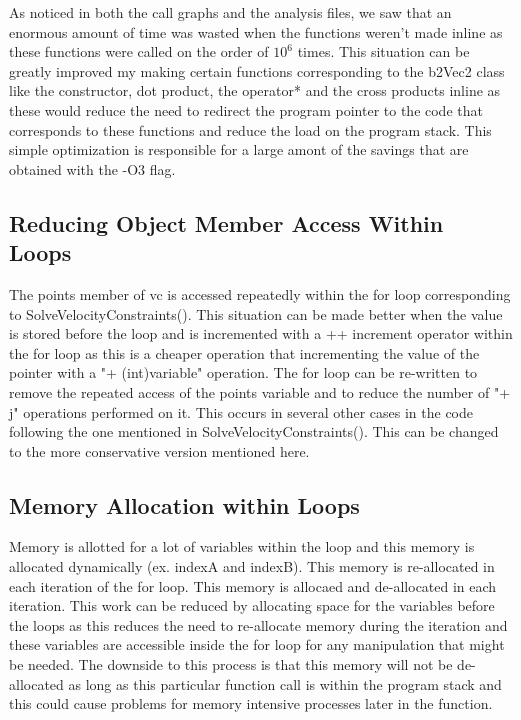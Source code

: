 \documentclass[11pt] {article}
\begin{document}
As noticed in both the call graphs and the analysis files, we saw that an enormous amount of time was 
wasted when the functions weren't made inline as these functions were called on the order of $10^6$
times. This situation can be greatly improved my making certain functions corresponding to the b2Vec2
class like the constructor, dot product, the operator* and the cross products inline as these would 
reduce the need to redirect the program pointer to the code that corresponds to these functions and
reduce the load on the program stack. This simple optimization is responsible for a large amont of
the savings that are obtained with the -O3 flag.

\subsection {Reducing Object Member Access Within Loops}

The points member of vc is accessed repeatedly within the for loop corresponding to SolveVelocityConstraints().
This situation can be made better when the value is stored before the loop and is incremented with a ++ 
increment operator within the for loop as this is a cheaper operation that incrementing the value of the 
pointer with a "+ (int)variable" operation. The for loop can be re-written to remove the repeated access
of the points variable and to reduce the number of "+ j" operations performed on it. This occurs in
 several other cases in the code following the one mentioned in SolveVelocityConstraints(). This can be
 changed to the more conservative version mentioned here.
 
\subsection {Memory Allocation within Loops}

Memory is allotted for a lot of variables within the loop and this memory is allocated dynamically (ex. 
indexA and indexB). This memory is re-allocated in each iteration of the for loop. This memory is 
allocaed and de-allocated in each iteration. This work can be reduced by allocating space for the 
variables before the loops as this reduces the need to re-allocate memory during the iteration and
these variables are accessible inside the for loop for any manipulation that might be needed. The
downside to this process is that this memory will not be de-allocated as long as this particular 
function call is within the program stack and this could cause problems for memory intensive
processes later in the function.
\end{document}
